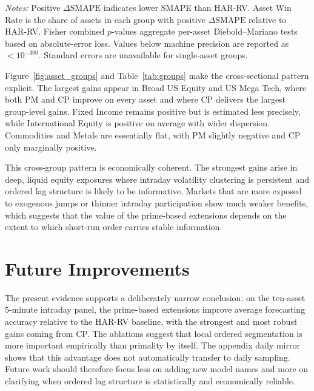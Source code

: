 \documentclass[a4paper]{article}
\begin{document}
\clearpage

{\renewcommand{\thetable}{5}
\begin{center}
\label{tab:groups}
\small
\renewcommand{\arraystretch}{1.15}
\setlength{\tabcolsep}{8pt}
\resizebox{0.88\textwidth}{!}{}

\vspace{0.1cm}
\footnotesize \parbox{0.92\textwidth}{\textit{Notes:} Positive $\Delta \mathrm{SMAPE}$ indicates lower SMAPE than HAR-RV. Asset Win Rate is the share of assets in each group with positive $\Delta \mathrm{SMAPE}$ relative to HAR-RV. Fisher combined $p$-values aggregate per-asset Diebold--Mariano tests based on absolute-error loss. Values below machine precision are reported as $< 10^{-300}$. Standard errors are unavailable for single-asset groups.}
\end{center}}

\noindent
Figure~\ref{fig:asset_groups} and Table~\ref{tab:groups} make the cross-sectional pattern explicit. The largest gains appear in Broad US Equity and US Mega Tech, where both PM and CP improve on every asset and where CP delivers the largest group-level gains. Fixed Income remains positive but is estimated less precisely, while International Equity is positive on average with wider dispersion. Commodities and Metals are essentially flat, with PM slightly negative and CP only marginally positive.

\noindent
This cross-group pattern is economically coherent. The strongest gains arise in deep, liquid equity exposures where intraday volatility clustering is persistent and ordered lag structure is likely to be informative. Markets that are more exposed to exogenous jumps or thinner intraday participation show much weaker benefits, which suggests that the value of the prime-based extensions depends on the extent to which short-run order carries stable information.


\section{Future Improvements}

\noindent
The present evidence supports a deliberately narrow conclusion: on the ten-asset 5-minute intraday panel, the prime-based extensions improve average forecasting accuracy relative to the HAR-RV baseline, with the strongest and most robust gains coming from CP. The ablations suggest that local ordered segmentation is more important empirically than primality by itself. The appendix daily mirror shows that this advantage does not automatically transfer to daily sampling. Future work should therefore focus less on adding new model names and more on clarifying when ordered lag structure is statistically and economically reliable.
\end{document}
